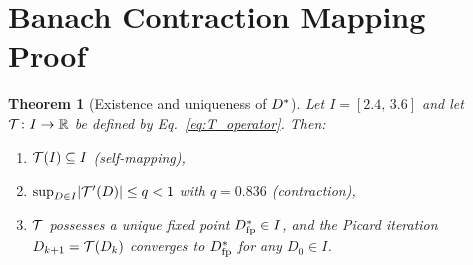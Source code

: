 \documentclass[amsmath,amssymb,aps,prd,twocolumn,superscriptaddress,nofootinbib]{revtex4-2}
\newtheorem{theorem}{Theorem}
\begin{document}
\section{Banach Contraction Mapping Proof}
\label{sec:banach}

\begin{theorem}[Existence and uniqueness of $D^{*}$]
\label{thm:banach}
Let $I = [2.4,\,3.6]$ and let
$\mathcal{T}\colon I \to \mathbb{R}$ be defined by
Eq.~\eqref{eq:T_operator}.  Then:
\begin{enumerate}
  \item[(i)]   $\mathcal{T}(I) \subseteq I$
    \quad (self-mapping),
  \item[(ii)]  $\sup_{D \in I}\lvert\mathcal{T}'(D)\rvert
    \leq q < 1$ with $q = 0.836$
    \quad (contraction),
  \item[(iii)] $\mathcal{T}$ possesses a unique fixed point
    $D^{*}_{\mathrm{fp}} \in I$, and the Picard iteration
    $D_{k+1} = \mathcal{T}(D_k)$ converges to $D^{*}_{\mathrm{fp}}$ for any
    $D_0 \in I$.
\end{enumerate}
\end{theorem}
\end{document}
